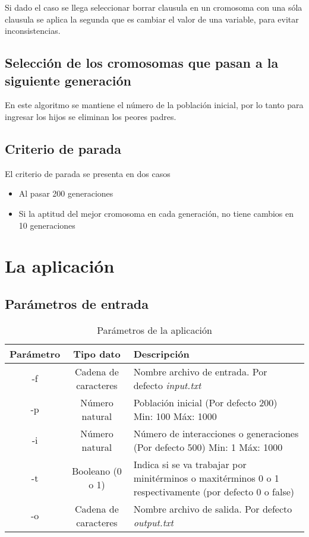 \documentclass[letter]{article}
\begin{document}
Si dado el caso se llega seleccionar borrar clausula en un cromosoma con una sóla clausula se aplica la segunda que es cambiar el valor de una variable, para evitar inconsistencias.	

\subsection{Selección de los cromosomas que pasan a la siguiente generación}

En este algoritmo se mantiene el número de la población inicial, por lo tanto para ingresar los hijos se eliminan los peores padres.

\subsection{Criterio de parada}

El criterio de parada se presenta en dos casos

\begin{itemize}
	\item Al pasar 200 generaciones
	\item Si la aptitud del mejor cromosoma en cada generación, no tiene cambios en 10 generaciones
\end{itemize}

\section{La aplicación}

\subsection{Parámetros de entrada}

\begin{table}[H]
	\centering
	\caption{Parámetros de la aplicación}
	\begin{tabular}{|c|c|p{5cm}|}
		\hline
		\textbf{Parámetro} & \textbf{Tipo dato} & \textbf{Descripción}\\
		\hline
		-f & Cadena de caracteres & Nombre archivo de entrada. Por defecto \textit{input.txt}\\
		\hline
		-p & Número natural & Población inicial (Por defecto 200) Min: 100 Máx: 1000\\
		\hline
		-i & Número natural & Número de interacciones o generaciones (Por defecto 500) Min: 1 Máx: 1000\\
		\hline
		-t & Booleano (0 o 1) & Indica si se va trabajar por minitérminos o maxitérminos 0 o 1 respectivamente (por defecto 0 o false)\\
		\hline
		-o & Cadena de caracteres & Nombre archivo de salida. Por defecto \textit{output.txt} \\
		\hline
	\end{tabular}
\end{table}
\end{document}
